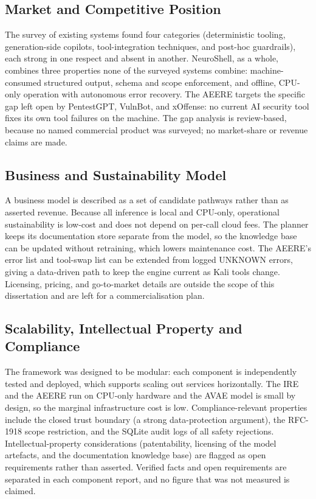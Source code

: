 \subsection{Market and Competitive Position}\label{sec:commercial-market}

The survey of existing systems found four categories (deterministic tooling,
generation-side copilots, tool-integration techniques, and post-hoc
guardrails), each strong in one respect and absent in another. NeuroShell, as a
whole, combines three properties none of the surveyed systems combine:
machine-consumed structured output, schema and scope enforcement, and offline,
CPU-only operation with autonomous error recovery. The AEERE targets the
specific gap left open by PentestGPT, VulnBot, and xOffense: no current AI
security tool fixes its own tool failures on the machine. The gap analysis is
review-based, because no named commercial product was surveyed; no market-share
or revenue claims are made.

\subsection{Business and Sustainability Model}\label{sec:commercial-business}

A business model is described as a set of candidate pathways rather than as
asserted revenue. Because all inference is local and CPU-only, operational
sustainability is low-cost and does not depend on per-call cloud fees. The
planner keeps its documentation store separate from the model, so the knowledge
base can be updated without retraining, which lowers maintenance cost. The
AEERE's error list and tool-swap list can be extended from logged UNKNOWN
errors, giving a data-driven path to keep the engine current as Kali tools
change. Licensing, pricing, and go-to-market details are outside the scope of
this dissertation and are left for a commercialisation plan.

\subsection{Scalability, Intellectual Property and Compliance}\label{sec:commercial-scalability}

The framework was designed to be modular: each component is independently
tested and deployed, which supports scaling out services horizontally. The IRE
and the AEERE run on CPU-only hardware and the AVAE model is small by design,
so the marginal infrastructure cost is low. Compliance-relevant properties
include the closed trust boundary (a strong data-protection argument), the
RFC-1918 scope restriction, and the SQLite audit logs of all safety rejections.
Intellectual-property considerations (patentability, licensing of the model
artefacts, and the documentation knowledge base) are flagged as open
requirements rather than asserted. Verified facts and open requirements are
separated in each component report, and no figure that was not measured is
claimed.

